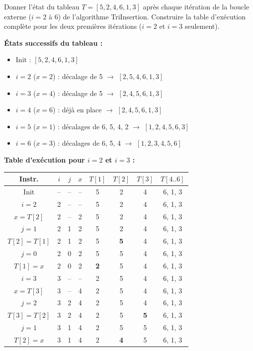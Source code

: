 \documentclass[11pt]{article}
\begin{document}
\begin{exercice}
Donner l'état du tableau $T = [5, 2, 4, 6, 1, 3]$ après chaque itération de la boucle externe ($i = 2$ à $6$) de l'algorithme TriInsertion. Construire la table d'exécution complète pour les deux premières itérations ($i=2$ et $i=3$ seulement).
\end{exercice}

\begin{corrige}[Exercice n]
\textbf{États successifs du tableau :}
\begin{itemize}
\item Init : $[5, 2, 4, 6, 1, 3]$
\item $i=2$ ($x=2$) : décalage de 5 $\rightarrow$ $[2, 5, 4, 6, 1, 3]$
\item $i=3$ ($x=4$) : décalage de 5 $\rightarrow$ $[2, 4, 5, 6, 1, 3]$
\item $i=4$ ($x=6$) : déjà en place $\rightarrow$ $[2, 4, 5, 6, 1, 3]$
\item $i=5$ ($x=1$) : décalages de 6, 5, 4, 2 $\rightarrow$ $[1, 2, 4, 5, 6, 3]$
\item $i=6$ ($x=3$) : décalages de 6, 5, 4 $\rightarrow$ $[1, 2, 3, 4, 5, 6]$
\end{itemize}

\textbf{Table d'exécution pour $i=2$ et $i=3$ :}
\begin{center}
\begin{tabular}{|c|c|c|c|c|c|c|c|}
\hline
\rowcolor{popblueL} \textbf{Instr.} & \textbf{$i$} & \textbf{$j$} & \textbf{$x$} & \textbf{$T[1]$} & \textbf{$T[2]$} & \textbf{$T[3]$} & \textbf{$T[4..6]$} \\
\hline
Init & -- & -- & -- & 5 & 2 & 4 & 6, 1, 3 \\
\hline
$i=2$ & 2 & -- & -- & 5 & 2 & 4 & 6, 1, 3 \\
$x=T[2]$ & 2 & -- & 2 & 5 & 2 & 4 & 6, 1, 3 \\
$j=1$ & 2 & 1 & 2 & 5 & 2 & 4 & 6, 1, 3 \\
$T[2]=T[1]$ & 2 & 1 & 2 & 5 & \textbf{5} & 4 & 6, 1, 3 \\
$j=0$ & 2 & 0 & 2 & 5 & 5 & 4 & 6, 1, 3 \\
$T[1]=x$ & 2 & 0 & 2 & \textbf{2} & 5 & 4 & 6, 1, 3 \\
\hline
$i=3$ & 3 & -- & -- & 2 & 5 & 4 & 6, 1, 3 \\
$x=T[3]$ & 3 & -- & 4 & 2 & 5 & 4 & 6, 1, 3 \\
$j=2$ & 3 & 2 & 4 & 2 & 5 & 4 & 6, 1, 3 \\
$T[3]=T[2]$ & 3 & 2 & 4 & 2 & 5 & \textbf{5} & 6, 1, 3 \\
$j=1$ & 3 & 1 & 4 & 2 & 5 & 5 & 6, 1, 3 \\
$T[2]=x$ & 3 & 1 & 4 & 2 & \textbf{4} & 5 & 6, 1, 3 \\
\hline
\end{tabular}
\end{center}
\end{corrige}
\end{document}
